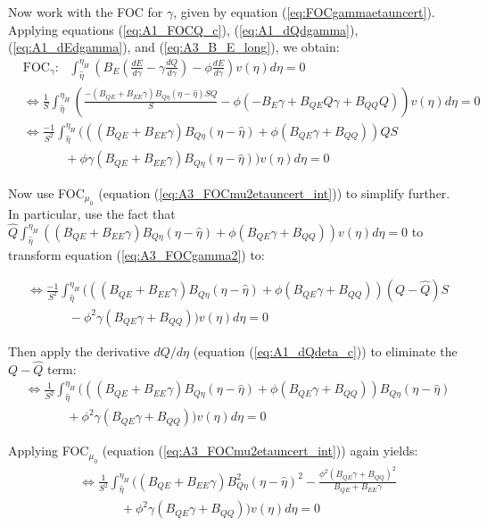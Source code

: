 \documentclass[12pt]{article}
\begin{document}
Now work with the FOC for $\gamma$, given by equation (\ref{eq:FOCgammaetauncert}). Applying equations (\ref{eq:A1_FOCQ_c}), (\ref{eq:A1_dQdgamma}), (\ref{eq:A1_dEdgamma}), and (\ref{eq:A3_B_E_long}), we obtain:
\begin{align}
&\text{FOC}_{\gamma}: \text{ } \int_{\hat{\eta}}^{\eta_H}\left(B_E(\frac{dE}{d\gamma}-\gamma\frac{dQ}{d\gamma}) -\phi\frac{dE}{d\gamma}\right)v(\eta)d\eta = 0 \\
&\Leftrightarrow \frac{1}{S}\int_{\hat{\eta}}^{\eta_H}\left(\frac{-(B_{QE}+B_{EE}\gamma)B_{Q\eta}(\eta-\hat{\eta})SQ}{S} - \phi(-B_E\gamma+B_{QE}Q\gamma+B_{QQ}Q)\right)v(\eta)d\eta = 0 \nonumber \\
&\Leftrightarrow \frac{-1}{S^2}\int_{\hat{\eta}}^{\eta_H}(((B_{QE}+B_{EE}\gamma)B_{Q\eta}(\eta-\hat{\eta}) + \phi(B_{QE}\gamma+B_{QQ}))QS \nonumber \\
& \hspace{40pt} + \phi\gamma(B_{QE}+B_{EE}\gamma)B_{Q\eta}(\eta-\hat{\eta}))v(\eta)d\eta = 0 \label{eq:A3_FOCgamma2}
\end{align}

Now use FOC$_{\mu_0}$ (equation (\ref{eq:A3_FOCmu2etauncert_int})) to simplify further. In particular, use the fact that $\hat{Q}\int_{\hat{\eta}}^{\eta_H}\left((B_{QE}+B_{EE}\gamma)B_{Q\eta}(\eta-\hat{\eta}) + \phi(B_{QE}\gamma+B_{QQ})\right)v(\eta)d\eta = 0$ to transform equation (\ref{eq:A3_FOCgamma2}) to:

\begin{align}
&\Leftrightarrow \frac{-1}{S^2}\int_{\hat{\eta}}^{\eta_H}(((B_{QE}+B_{EE}\gamma)B_{Q\eta}(\eta-\hat{\eta}) + \phi(B_{QE}\gamma+B_{QQ}))(Q-\hat{Q})S \nonumber \\
& \hspace{40pt} - \phi^2\gamma(B_{QE}\gamma+B_{QQ}))v(\eta)d\eta = 0
\end{align}

Then apply the derivative $dQ/d\eta$ (equation (\ref{eq:A1_dQdeta_c})) to eliminate the $Q-\hat{Q}$ term:
\begin{align}
&\Leftrightarrow \frac{1}{S^2}\int_{\hat{\eta}}^{\eta_H}(((B_{QE}+B_{EE}\gamma)B_{Q\eta}(\eta-\hat{\eta}) + \phi(B_{QE}\gamma+B_{QQ}))B_{Q\eta}(\eta-\hat{\eta}) \nonumber \\
& \hspace{40pt} + \phi^2\gamma(B_{QE}\gamma+B_{QQ}))v(\eta)d\eta = 0
\end{align}

Applying FOC$_{\mu_0}$ (equation (\ref{eq:A3_FOCmu2etauncert_int})) again yields:
\begin{align}
&\Leftrightarrow \frac{1}{S^2}\int_{\hat{\eta}}^{\eta_H}((B_{QE}+B_{EE}\gamma)B_{Q\eta}^2(\eta-\hat{\eta})^2 - \frac{\phi^2(B_{QE}\gamma+B_{QQ})^2}{B_{QE}+B_{EE}\gamma} \nonumber \\
& \hspace{40pt} + \phi^2\gamma(B_{QE}\gamma+B_{QQ}))v(\eta)d\eta = 0 \label{eq:A3_FOCgamma3}
\end{align}
\end{document}

